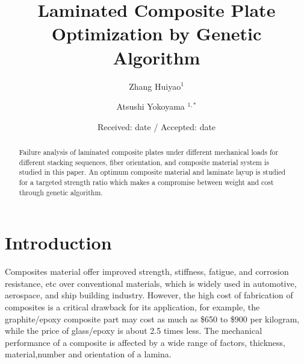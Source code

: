 \documentclass[smallextended]{svjour3}       %
\begin{document}
\title{Laminated Composite Plate Optimization by Genetic Algorithm}
\author{Zhang Huiyao$^1$  \and
	Atsushi Yokoyama $^{1,*}$
}
\date{Received: date / Accepted: date}
\maketitle

\begin{abstract}
Failure analysis of laminated composite plates under different mechanical loads for different
stacking sequences, fiber orientation, and composite material system is studied in this paper.
An optimum composite material and laminate layup is studied for a targeted strength ratio which
makes a compromise between weight and cost through genetic algorithm.


\end{abstract}



\section{Introduction}
Composites material offer improved strength, stiffness, fatigue, and corrosion
resistance, etc over conventional materials, which is widely used in
automotive, aerospace, and ship building industry.  However, the high cost of
fabrication of composites is a critical drawback for its application, for
example, the graphite/epoxy composite part may cost as much as \$650 to \$900
per kilogram, while the price of glass/epoxy is about 2.5 times less.  The
mechanical performance of a composite is affected by a wide range of factors,
thickness, material,number and orientation of a lamina.
\end{document}
